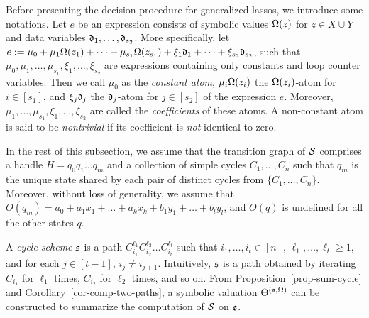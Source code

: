 Before presenting the decision procedure for generalized lassos, we introduce some notations.
Let $e$ be an expression consists of symbolic values $\Omega(z)$ for $z\in X\cup Y$ and data variables $\mathfrak{d}_1, \dots, \mathfrak{d}_{s_2}$. More specifically, let $e:=\mu_0 + \mu_1 \Omega(z_1) +\dots + \mu_{s_1} \Omega(z_{s_1}) + \xi_1 \mathfrak{d}_1 + \dots + \xi_{s_2} \mathfrak{d}_{s_2}$,
such that $\mu_0,\mu_1,\dots,\mu_{s_1}, \xi_1,\dots,\xi_{s_2}$ are expressions containing only constants and loop counter variables.
Then we call $\mu_0$ as the \emph{constant atom}, $\mu_i \Omega(z_i)$ the $\Omega(z_i)$-atom for $i\in[s_1]$, and $\xi_j \mathfrak{d}_j$ the $\mathfrak{d}_j$-atom for $j\in[s_2]$ of the expression $e$. Moreover, $\mu_1, \dots, \mu_{s_1}, \xi_1,\dots, \xi_{s_2}$ are called the \emph{coefficients} of these atoms. A non-constant atom is said to be \emph{nontrivial} if its coefficient is \emph{not} identical to zero.

In the rest of this subsection, we assume that the transition graph of ${\mathcal{S} }$ comprises a handle $H=q_0 q_1 \dots q_m$ and a collection of simple cycles $C_1,\dots,C_n$ such that $q_m$ is the unique state shared by each pair of distinct cycles from $\{C_1,\dots,C_n\}$. Moreover, without loss of generality, we assume that $O(q_m) = a_0 + a_1 x_1 + \dots + a_k x_k + b_1 y_1 + \dots + b_l y_l$, and $O(q)$ is undefined for all the other states $q$.

A \emph{cycle scheme} ${\mathfrak{s} }$ is a path $C_{i_1}^{\ell_1} C_{i_2}^{\ell_2} \dots C_{i_t}^{\ell_t}$ such that $i_1,\dots,i_t \in [n]$, $\ell_1,\dots, \ell_t \ge 1$, and for each $j\in [t-1]$, $i_j \neq i_{j+1}$. Intuitively, ${\mathfrak{s} }$ is a path obtained by iterating $C_{i_1}$ for $\ell_1$ times, $C_{i_2}$ for $\ell_2$ times, and so on. From Proposition~\ref{prop-sum-cycle} and Corollary~\ref{cor-comp-two-paths}, a symbolic valuation $\Theta^{({\mathfrak{s} },\Omega)}$ can be constructed 
to summarize the computation of ${\mathcal{S} }$ on ${\mathfrak{s} }$. 


